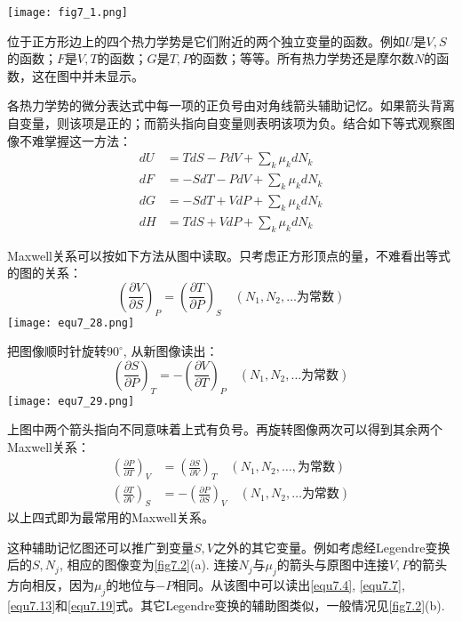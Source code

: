 {
	\centering
	\texttt{[image: fig7\_1.png]}
	\label{fig7.1}
}

位于正方形边上的四个热力学势是它们附近的两个独立变量的函数。例如$U$是$V, S$的函数；$F$是$V, T$的函数；$G$是$T, P$的函数；等等。所有热力学势还是摩尔数$N$的函数，这在图中并未显示。

各热力学势的微分表达式中每一项的正负号由对角线箭头辅助记忆。如果箭头背离自变量，则该项是正的；而箭头指向自变量则表明该项为负。结合如下等式观察图像不难掌握这一方法：
\begin{align}
	dU &= TdS - PdV + \sum_k \mu_k dN_k \label{equ7.24} \\
	dF &= -SdT - PdV + \sum_k \mu_k dN_k \label{equ7.25} \\
	dG &= -SdT + VdP + \sum_k \mu_k dN_k  \label{equ7.26} \\
	dH &= TdS + VdP + \sum_k \mu_k dN_k  \label{equ7.27}
\end{align}

Maxwell关系可以按如下方法从图中读取。只考虑正方形顶点的量，不难看出等式的图的关系：
\begin{equation}
	\left( \frac{\partial V}{\partial S} \right)_P = \left( \frac{\partial T}{\partial P} \right)_S \quad (N_1, N_2, \dots \text{为常数})
\label{equ7.28}
\end{equation}
{
	\centering
	\texttt{[image: equ7\_28.png]}
}

把图像顺时针旋转$90^\circ$, 从新图像读出：
\begin{equation}
	\left( \frac{\partial S}{\partial P} \right)_T = -\left( \frac{\partial V}{\partial T} \right)_P \quad (N_1, N_2, \dots \text{为常数})
\label{equ7.29}
\end{equation}
{
	\centering
	\texttt{[image: equ7\_29.png]}
}

上图中两个箭头指向不同意味着上式有负号。再旋转图像两次可以得到其余两个Maxwell关系：
\begin{align}
	\left( \frac{\partial P}{\partial T} \right)_V &= \left( \frac{\partial S}{\partial V} \right)_T \quad (N_1, N_2, \dots, \text{为常数}) \label{equ7.30}\\
	\left( \frac{\partial T}{\partial V} \right)_S &= - \left( \frac{\partial P}{\partial S} \right)_V \quad (N_1, N_2, \dots \text{为常数}) \label{equ7.31}
\end{align}
以上四式即为最常用的Maxwell关系。

这种辅助记忆图还可以推广到变量$S, V$之外的其它变量。例如考虑经Legendre变换后的$S, N_j$, 相应的图像变为\ref{fig7.2}(a). 连接$N_j$与$\mu_j$的箭头与原图中连接$V, P$的箭头方向相反，因为$\mu_j$的地位与$-P$相同。从该图中可以读出\eqref{equ7.4}, \eqref{equ7.7}, \eqref{equ7.13}和\eqref{equ7.19}式。其它Legendre变换的辅助图类似，一般情况见\ref{fig7.2}(b).

